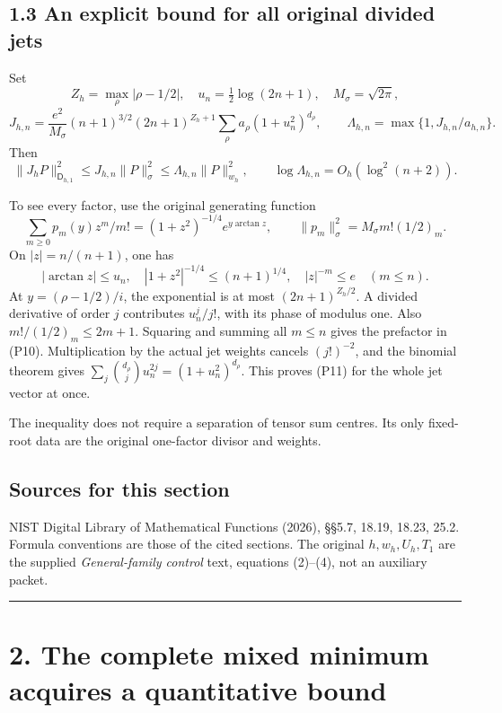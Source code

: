 \subsection{1.3 An explicit bound for all original divided jets}\label{an-explicit-bound-for-all-original-divided-jets}

Set \[
 Z_h=\max_\rho|\rho-1/2|,\quad
 u_n=\tfrac12\log(2n+1),\quad M_\sigma=\sqrt{2\pi},
\] \[
 J_{h,n}=
 \frac{e^2}{M_\sigma}(n+1)^{3/2}(2n+1)^{Z_h+1}
 \sum_\rho a_\rho(1+u_n^2)^{d_\rho},\qquad
 \Lambda_{h,n}=\max\{1,J_{h,n}/a_{h,n}\}. \tag{P10}
\] Then \[
\boxed{
 \|J_hP\|_{\mathsf D_{h,1}}^2\le J_{h,n}\|P\|_\sigma^2
 \le\Lambda_{h,n}\|P\|_{w_h}^2,\qquad
 \log\Lambda_{h,n}=O_h(\log^2(n+2)).
} \tag{P11}
\]

To see every factor, use the original generating function \[
 \sum_{m\ge0}p_m(y)z^m/m!=(1+z^2)^{-1/4}e^{y\arctan z},
 \qquad \|p_m\|_\sigma^2=M_\sigma m!(1/2)_m.
\] On \(|z|=n/(n+1)\), one has \[
 |\arctan z|\le u_n,\quad
 |1+z^2|^{-1/4}\le(n+1)^{1/4},\quad |z|^{-m}\le e
 \quad(m\le n).
\] At \(y=(\rho-1/2)/i\), the exponential is at most \((2n+1)^{Z_h/2}\). A divided derivative of order \(j\) contributes \(u_n^j/j!\), with its phase of modulus one. Also \(m!/(1/2)_m\le2m+1\). Squaring and summing all \(m\le n\) gives the prefactor in (P10). Multiplication by the actual jet weights cancels \((j!)^{-2}\), and the binomial theorem gives \(\sum_j\binom{d_\rho}{j}u_n^{2j}=(1+u_n^2)^{d_\rho}\). This proves (P11) for the whole jet vector at once.

The inequality does not require a separation of tensor sum centres. Its only fixed-root data are the original one-factor divisor and weights.

\subsection{Sources for this section}\label{sources-for-this-section}

NIST Digital Library of Mathematical Functions (2026), §§5.7, 18.19, 18.23, 25.2. Formula conventions are those of the cited sections. The original \(h,w_h,U_h,T_1\) are the supplied \emph{General-family control} text, equations (2)--(4), not an auxiliary packet.

\begin{center}\rule{0.5\linewidth}{0.5pt}\end{center}

\section{2. The complete mixed minimum acquires a quantitative bound}\label{the-complete-mixed-minimum-acquires-a-quantitative-bound}

